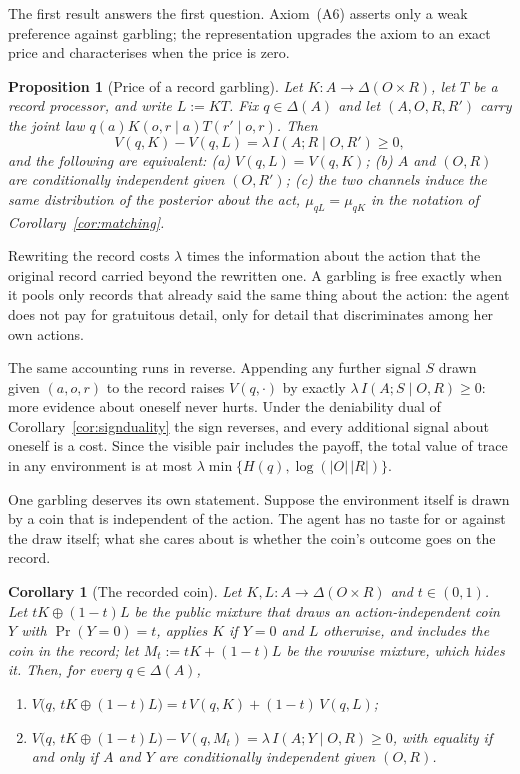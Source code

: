 \documentclass[11pt,a4paper]{article}
\newtheorem{proposition}[theorem]{Proposition}
\newtheorem{corollary}[theorem]{Corollary}
\theoremstyle{definition}
\newcommand{\D}{\Delta}
\newcommand{\I}{I}
\newcommand{\Sh}{H}
\newcommand{\1}{\mathbf 1}
\begin{document}
The first result answers the first question.  Axiom~\textup{(A6)} asserts only a weak preference against
garbling; the representation upgrades the axiom to an exact price and characterises when the price is zero.

\begin{proposition}[Price of a record garbling]\label{prop:garbling-price}
Let $K:A\to\D(O\times R)$, let $T$ be a record processor, and write
$L:=KT$.  Fix $q\in\D(A)$ and let $(A,O,R,R')$ carry the joint law $q(a)K(o,r\mid a)T(r'\mid o,r)$.  Then
\[
 V(q,K)-V(q,L)=\lambda\,\I\!\left(A;R\mid O,R'\right)\ge0,
\]
and the following are equivalent:
\textup{(a)} $V(q,L)=V(q,K)$;
\textup{(b)} $A$ and $(O,R)$ are conditionally independent given $(O,R')$;
\textup{(c)} the two channels induce the same distribution of the posterior about the act,
$\mu_{qL}=\mu_{qK}$ in the notation of Corollary~\ref{cor:matching}.
\end{proposition}

Rewriting the record costs $\lambda$ times the information about the action that the original record carried
beyond the rewritten one.  A garbling is free exactly when it pools only records that already said the same
thing about the action: the agent does not pay for gratuitous detail, only for detail that discriminates among
her own actions.

The same accounting runs in reverse.  Appending any further signal $S$ drawn given $(a,o,r)$ to the record
raises $V(q,\cdot)$ by exactly $\lambda\,\I(A;S\mid O,R)\ge0$: more evidence about oneself never hurts.  Under
the deniability dual of Corollary~\ref{cor:signduality} the sign reverses, and every additional signal about
oneself is a cost.  Since the visible pair includes the payoff, the total value of trace in any environment is
at most $\lambda\min\{\Sh(q),\log(|O|\,|R|)\}$.

One garbling deserves its own statement.  Suppose the environment itself is drawn by a coin that is independent
of the action.  The agent has no taste for or against the draw itself; what she cares about is whether the
coin's outcome goes on the record.

\begin{corollary}[The recorded coin]\label{cor:recorded-coin}
Let $K,L:A\to\D(O\times R)$ and $t\in(0,1)$.  Let $tK\oplus(1-t)L$ be the public mixture that draws an
action-independent coin $Y$ with $\Pr(Y=0)=t$, applies $K$ if $Y=0$ and $L$ otherwise, and includes the coin in
the record; let $M_t:=tK+(1-t)L$ be the rowwise mixture, which hides it.  Then, for every $q\in\D(A)$,
\begin{enumerate}[label=\textup{(\roman*)},leftmargin=*]
\item $V\bigl(q,\,tK\oplus(1-t)L\bigr)=t\,V(q,K)+(1-t)\,V(q,L)$;
\item $V\bigl(q,\,tK\oplus(1-t)L\bigr)-V(q,M_t)=\lambda\,\I(A;Y\mid O,R)\ge0$, with equality if and only if $A$
and $Y$ are conditionally independent given $(O,R)$.
\end{enumerate}
\end{corollary}
\end{document}
